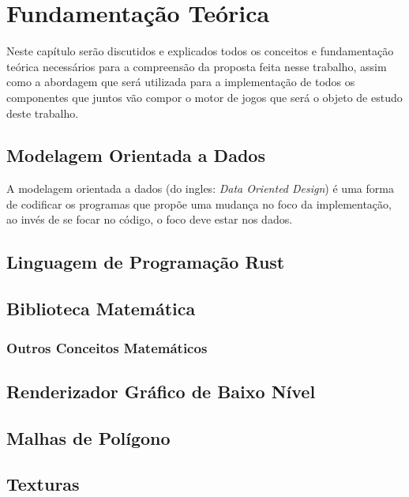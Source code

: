 \setlength\abovedisplayskip{0pt} \setlength\belowdisplayskip{0pt}
\setlength\abovedisplayshortskip{0pt} \setlength\belowdisplayshortskip{0pt}

\chapter{Fundamenta\c{c}\~ao Te\'orica}
\label{cap1}

Neste capítulo serão discutidos e explicados todos os conceitos e 
fundamentação teórica necessários para a compreensão da proposta 
feita nesse trabalho, assim como a abordagem que será utilizada 
para a implementação de todos os componentes que juntos vão compor 
o motor de jogos que será o objeto de estudo deste trabalho.

\section{Modelagem Orientada a Dados}

A modelagem orientada a dados (do ingles: \textit{Data Oriented Design}) é 
uma forma de codificar os programas que propõe uma mudança no foco da 
implementação, ao invés de se focar no código, o foco deve estar nos 
dados.

\section{Linguagem de Programação Rust}

\section{Biblioteca Matemática}

\subsection{Outros Conceitos Matemáticos}

\section{Renderizador Gráfico de Baixo Nível}

\section{Malhas de Polígono}

\section{Texturas}

